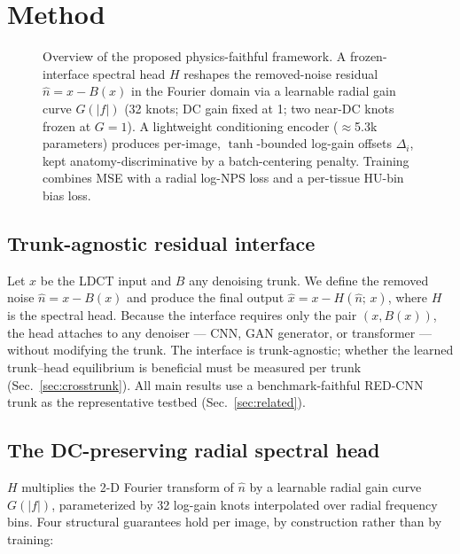\section{Method}
\label{sec:method}

\begin{figure}[t]
  \centering
  
  \caption{Overview of the proposed physics-faithful framework. A frozen-interface spectral head $H$ reshapes the removed-noise residual $\hat{n} = x - B(x)$ in the Fourier domain via a learnable radial gain curve $G(|f|)$ (32 knots; DC gain fixed at 1; two near-DC knots frozen at $G{=}1$). A lightweight conditioning encoder ($\approx$5.3k parameters) produces per-image, $\tanh$-bounded log-gain offsets $\Delta_i$, kept anatomy-discriminative by a batch-centering penalty. Training combines MSE with a radial log-NPS loss and a per-tissue HU-bin bias loss.}
  \label{fig:architecture}
\end{figure}

\subsection{Trunk-agnostic residual interface}
\label{sec:interface}

Let $x$ be the LDCT input and $B$ any denoising trunk. We define the removed noise $\hat{n} = x - B(x)$ and produce the final output $\hat{x} = x - H(\hat{n};\, x)$, where $H$ is the spectral head. Because the interface requires only the pair $(x, B(x))$, the head attaches to any denoiser --- CNN, GAN generator, or transformer --- without modifying the trunk. The interface is trunk-agnostic; whether the learned trunk--head equilibrium is beneficial must be measured per trunk (Sec.~\ref{sec:crosstrunk}). All main results use a benchmark-faithful RED-CNN trunk as the representative testbed (Sec.~\ref{sec:related}).

\subsection{The DC-preserving radial spectral head}
\label{sec:head}

$H$ multiplies the 2-D Fourier transform of $\hat{n}$ by a learnable radial gain curve $G(|f|)$, parameterized by 32 log-gain knots interpolated over radial frequency bins. Four structural guarantees hold per image, by construction rather than by training:

